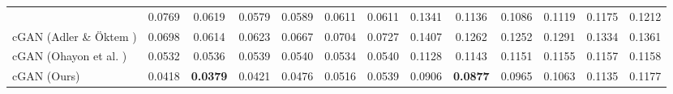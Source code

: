 \documentclass{article}
\theoremstyle{plain}
\theoremstyle{definition}
\theoremstyle{remark}
\begin{document}
\begin{table}[t]
{\begin{tabular}{lcccccccccccc}
          & 0.0769 & 0.0619 & 0.0579 & 0.0589 & 0.0611 & 0.0611
          & 0.1341 & 0.1136 & 0.1086 & 0.1119 & 0.1175 & 0.1212\\
    cGAN (Adler \& \"Oktem \cite{Adler:18}) 
          & 0.0698 & 0.0614 & 0.0623 & 0.0667 & 0.0704 & 0.0727
          & 0.1407 & 0.1262 & 0.1252 & 0.1291 & 0.1334 & 0.1361\\
    cGAN (Ohayon et al. \cite{Ohayon:ICCVW:21}) 
          & 0.0532 & 0.0536 & 0.0539 & 0.0540 & 0.0534 & 0.0540
          & 0.1128 & 0.1143 & 0.1151 & 0.1155 & 0.1157 & 0.1158\\
    cGAN (Ours) 
          & 0.0418 & \bf 0.0379 & 0.0421 & 0.0476 & 0.0516 & 0.0539
          & 0.0906 & \bf 0.0877 & 0.0965 & 0.1063 & 0.1135 & 0.1177\\
    \bottomrule
  \end{tabular}%
  }
\end{table}
\end{document}
